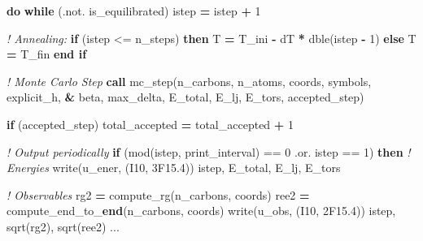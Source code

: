 \documentclass[
]{article}
\newenvironment{Shaded}{}{}
\newcommand{\BuiltInTok}[1]{\textcolor[rgb]{0.00,0.50,0.00}{#1}}
\newcommand{\CommentTok}[1]{\textcolor[rgb]{0.38,0.63,0.69}{\textit{#1}}}
\newcommand{\DecValTok}[1]{\textcolor[rgb]{0.25,0.63,0.44}{#1}}
\newcommand{\FunctionTok}[1]{\textcolor[rgb]{0.02,0.16,0.49}{#1}}
\newcommand{\KeywordTok}[1]{\textcolor[rgb]{0.00,0.44,0.13}{\textbf{#1}}}
\newcommand{\NormalTok}[1]{#1}
\newcommand{\OperatorTok}[1]{\textcolor[rgb]{0.40,0.40,0.40}{#1}}
\newcommand{\StringTok}[1]{\textcolor[rgb]{0.25,0.44,0.63}{#1}}
\begin{document}
\begin{Shaded}
\begin{Highlighting}[]
  \KeywordTok{do} \KeywordTok{while}\NormalTok{ (}\OperatorTok{.not.}\NormalTok{ is\_equilibrated)}
\NormalTok{    istep }\KeywordTok{=}\NormalTok{ istep }\KeywordTok{+} \DecValTok{1}

    \CommentTok{! Annealing:}
    \KeywordTok{if}\NormalTok{ (istep }\OperatorTok{\textless{}=}\NormalTok{ n\_steps) }\KeywordTok{then}
\NormalTok{      T }\KeywordTok{=}\NormalTok{ T\_ini }\KeywordTok{{-}}\NormalTok{ dT }\KeywordTok{*} \BuiltInTok{dble}\NormalTok{(istep }\KeywordTok{{-}} \DecValTok{1}\NormalTok{)}
    \KeywordTok{else}
\NormalTok{      T }\KeywordTok{=}\NormalTok{ T\_fin}
    \KeywordTok{end if}
    
    \CommentTok{! Monte Carlo Step}
    \KeywordTok{call}\NormalTok{ mc\_step(n\_carbons, n\_atoms, coords, symbols, explicit\_h, }\KeywordTok{\&}
\NormalTok{                 beta, max\_delta, E\_total, E\_lj, E\_tors, accepted\_step)}
    
    \KeywordTok{if}\NormalTok{ (accepted\_step) total\_accepted }\KeywordTok{=}\NormalTok{ total\_accepted }\KeywordTok{+} \DecValTok{1}

    \CommentTok{! Output periodically}
    \KeywordTok{if}\NormalTok{ (}\BuiltInTok{mod}\NormalTok{(istep, print\_interval) }\OperatorTok{==} \DecValTok{0} \OperatorTok{.or.}\NormalTok{ istep }\OperatorTok{==} \DecValTok{1}\NormalTok{) }\KeywordTok{then}
      \CommentTok{! Energies}
      \FunctionTok{write(}\NormalTok{u\_ener, }\StringTok{\textquotesingle{}(I10, 3F15.4)\textquotesingle{}}\FunctionTok{)}\NormalTok{ istep, E\_total, E\_lj, E\_tors}

      \CommentTok{! Observables}
\NormalTok{      rg2 }\KeywordTok{=}\NormalTok{ compute\_rg(n\_carbons, coords)}
\NormalTok{      ree2 }\KeywordTok{=}\NormalTok{ compute\_end\_to\_}\KeywordTok{end}\NormalTok{(n\_carbons, coords)}
      \FunctionTok{write(}\NormalTok{u\_obs, }\StringTok{\textquotesingle{}(I10, 2F15.4)\textquotesingle{}}\FunctionTok{)}\NormalTok{ istep, }\BuiltInTok{sqrt}\NormalTok{(rg2), }\BuiltInTok{sqrt}\NormalTok{(ree2)}
\NormalTok{      ...}
\end{Highlighting}
\end{Shaded}
\end{document}
